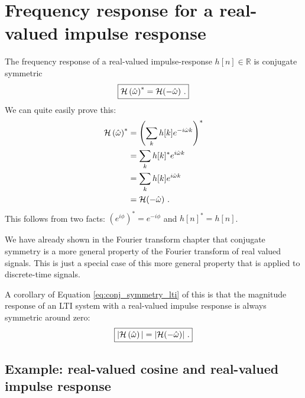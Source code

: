 \section{Frequency response for a real-valued impulse response}

The frequency response of a real-valued impulse-response
$h[n]\in \mathbb{R}$ is conjugate symmetric
\begin{equation}
\boxed{
\mathcal{H}\left(\hat{\omega}\right)^* = \mathcal{H}(-\hat{\omega})\,\,.
}
\label{eq:conj_symmetry_lti}
\end{equation}
We can quite easily prove this:
\begin{align}
\mathcal{H}\left(\hat{\omega}\right)^* &= \left(\sum_k h[k] e^{-i\hat{\omega}k}\right)^* \\
        &= \sum_k h[k]^* e^{i\hat{\omega}k} \\
        &= \sum_k h[k] e^{i\hat{\omega}k} \\
        &= \mathcal{H}(-\hat{\omega})\,\,.
\end{align}
This follows from two facts: $(e^{i\phi})^* = e^{-i\phi}$ and $h[n]^*
= h[n]$.

We have already shown in the Fourier transform chapter that conjugate
symmetry is a more general property of the Fourier transform of real
valued signals. This is just a special case of this more general
property that is applied to discrete-time signals.

A corollary of Equation \ref{eq:conj_symmetry_lti} of this is that the
magnitude response of an LTI system with a real-valued impulse
response is always symmetric around zero:
\begin{equation}
\boxed{
|\mathcal{H}\left(\hat{\omega}\right)| = |\mathcal{H}(-\hat{\omega})|\,\,.
}
\end{equation}

\subsection{Example: real-valued cosine and real-valued impulse response}

